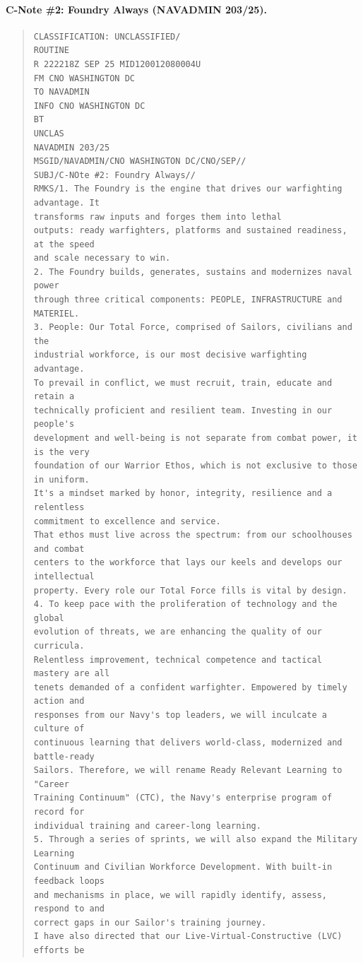 \documentclass[../main.tex]{subfiles}
\begin{document}
\paragraph{C-Note \#2: Foundry Always (NAVADMIN 203/25).}
\begin{quote}
  \small\begin{verbatim}
CLASSIFICATION: UNCLASSIFIED/
ROUTINE
R 222218Z SEP 25 MID120012080004U
FM CNO WASHINGTON DC
TO NAVADMIN
INFO CNO WASHINGTON DC
BT
UNCLAS
NAVADMIN 203/25
MSGID/NAVADMIN/CNO WASHINGTON DC/CNO/SEP//
SUBJ/C-NOte #2: Foundry Always//
RMKS/1. The Foundry is the engine that drives our warfighting advantage. It
transforms raw inputs and forges them into lethal
outputs: ready warfighters, platforms and sustained readiness, at the speed
and scale necessary to win.
2. The Foundry builds, generates, sustains and modernizes naval power
through three critical components: PEOPLE, INFRASTRUCTURE and MATERIEL.
3. People: Our Total Force, comprised of Sailors, civilians and the
industrial workforce, is our most decisive warfighting advantage.
To prevail in conflict, we must recruit, train, educate and retain a
technically proficient and resilient team. Investing in our people's
development and well-being is not separate from combat power, it is the very
foundation of our Warrior Ethos, which is not exclusive to those in uniform.
It's a mindset marked by honor, integrity, resilience and a relentless
commitment to excellence and service.
That ethos must live across the spectrum: from our schoolhouses and combat
centers to the workforce that lays our keels and develops our intellectual
property. Every role our Total Force fills is vital by design.
4. To keep pace with the proliferation of technology and the global
evolution of threats, we are enhancing the quality of our curricula.
Relentless improvement, technical competence and tactical mastery are all
tenets demanded of a confident warfighter. Empowered by timely action and
responses from our Navy's top leaders, we will inculcate a culture of
continuous learning that delivers world-class, modernized and battle-ready
Sailors. Therefore, we will rename Ready Relevant Learning to "Career
Training Continuum" (CTC), the Navy's enterprise program of record for
individual training and career-long learning.
5. Through a series of sprints, we will also expand the Military Learning
Continuum and Civilian Workforce Development. With built-in feedback loops
and mechanisms in place, we will rapidly identify, assess, respond to and
correct gaps in our Sailor's training journey.
I have also directed that our Live-Virtual-Constructive (LVC) efforts be

\end{verbatim}
\end{quote}
\end{document}
